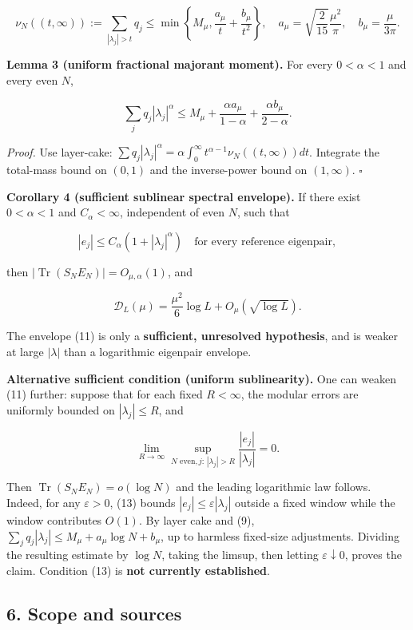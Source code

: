 \documentclass[
  10pt,
  a4paper,
]{article}
\begin{document}
\[
\nu_N((t,\infty)):=\sum_{|\lambda_j|>t}q_j
\le\min\left\{M_\mu,\frac{a_\mu}{t}+\frac{b_\mu}{t^2}\right\},
\quad a_\mu=\sqrt{\frac2{15}}\frac{\mu^2}{\pi},\quad b_\mu=\frac\mu{3\pi}.
\tag{9}
\]

\textbf{Lemma 3 (uniform fractional majorant moment).} For every \(0<\alpha<1\) and every even \(N\),

\[
\boxed{
\sum_jq_j|\lambda_j|^\alpha
\le M_\mu+\frac{\alpha a_\mu}{1-\alpha}
+\frac{\alpha b_\mu}{2-\alpha}.}
\tag{10}
\]

\emph{Proof.} Use layer-cake: \(\sum q_j|\lambda_j|^\alpha=\alpha\int_0^\infty t^{\alpha-1}\nu_N((t,\infty))dt\). Integrate the total-mass bound on \((0,1)\) and the inverse-power bound on \((1,\infty)\). \(\square\)

\textbf{Corollary 4 (sufficient sublinear spectral envelope).} If there exist \(0<\alpha<1\) and \(C_\alpha<\infty\), independent of even \(N\), such that

\[
|e_j|\le C_\alpha(1+|\lambda_j|^\alpha)\quad\text{for every reference eigenpair},
\tag{11}
\]

then \(|\operatorname{Tr}(S_NE_N)|=O_{\mu,\alpha}(1)\), and

\[
\mathcal D_L(\mu)=\frac{\mu^2}{6}\log L+O_\mu(\sqrt{\log L}).
\tag{12}
\]

The envelope (11) is only a \textbf{sufficient, unresolved hypothesis}, and is weaker at large \(|\lambda|\) than a logarithmic eigenpair envelope.

\textbf{Alternative sufficient condition (uniform sublinearity).} One can weaken (11) further: suppose that for each fixed \(R<\infty\), the modular errors are uniformly bounded on \(|\lambda_j|\le R\), and

\[
\lim_{R\to\infty}\sup_{N\text{ even},j:\,|\lambda_j|>R}
\frac{|e_j|}{|\lambda_j|}=0.
\tag{13}
\]

Then \(\operatorname{Tr}(S_NE_N)=o(\log N)\) and the leading logarithmic law follows. Indeed, for any \(\varepsilon>0\), (13) bounds \(|e_j|\le\varepsilon|\lambda_j|\) outside a fixed window while the window contributes \(O(1)\). By layer cake and (9), \(\sum_jq_j|\lambda_j|\le M_\mu+a_\mu\log N+b_\mu\), up to harmless fixed-size adjustments. Dividing the resulting estimate by \(\log N\), taking the limsup, then letting \(\varepsilon\downarrow0\), proves the claim. Condition (13) is \textbf{not currently established}.

\subsection{6. Scope and sources}\label{scope-and-sources}
\end{document}
